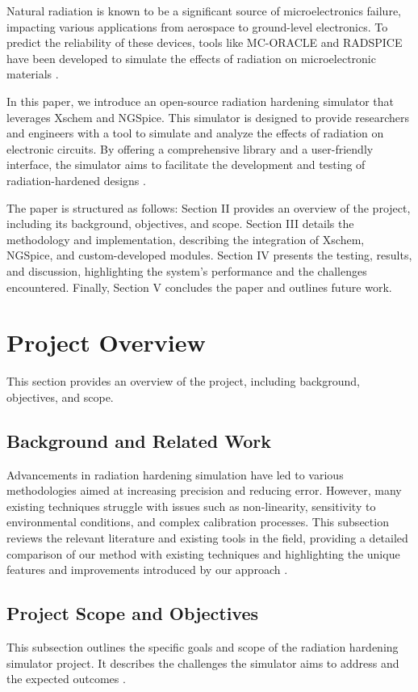 \documentclass[conference]{IEEEtran}
\begin{document}
Natural radiation is known to be a significant source of microelectronics failure, impacting various applications from aerospace to ground-level electronics. To predict the reliability of these devices, tools like MC-ORACLE and RADSPICE have been developed to simulate the effects of radiation on microelectronic materials \cite{Wrobel2011, Florian1986}.

In this paper, we introduce an open-source radiation hardening simulator that leverages Xschem and NGSpice. This simulator is designed to provide researchers and engineers with a tool to simulate and analyze the effects of radiation on electronic circuits. By offering a comprehensive library and a user-friendly interface, the simulator aims to facilitate the development and testing of radiation-hardened designs \cite{Pepper1990}.

The paper is structured as follows: Section II provides an overview of the project, including its background, objectives, and scope. Section III details the methodology and implementation, describing the integration of Xschem, NGSpice, and custom-developed modules. Section IV presents the testing, results, and discussion, highlighting the system's performance and the challenges encountered. Finally, Section V concludes the paper and outlines future work.

\section{Project Overview}
This section provides an overview of the project, including background, objectives, and scope.

\subsection{Background and Related Work}
Advancements in radiation hardening simulation have led to various methodologies aimed at increasing precision and reducing error. However, many existing techniques struggle with issues such as non-linearity, sensitivity to environmental conditions, and complex calibration processes. This subsection reviews the relevant literature and existing tools in the field, providing a detailed comparison of our method with existing techniques and highlighting the unique features and improvements introduced by our approach \cite{Wrobel2011, Florian1986, Pepper1990}.

\subsection{Project Scope and Objectives}
This subsection outlines the specific goals and scope of the radiation hardening simulator project. It describes the challenges the simulator aims to address and the expected outcomes \cite{Wrobel2011, Florian1986}.
\end{document}
